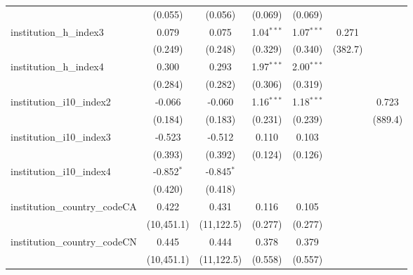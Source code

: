 \begin{tabular}{lcccccc}
                                         & (0.055)        & (0.056)        & (0.069)       & (0.069)       &               &   \\   
   institution\_h\_index3                & 0.079          & 0.075          & 1.04$^{***}$  & 1.07$^{***}$  & 0.271         &   \\   
                                         & (0.249)        & (0.248)        & (0.329)       & (0.340)       & (382.7)       &   \\   
   institution\_h\_index4                & 0.300          & 0.293          & 1.97$^{***}$  & 2.00$^{***}$  &               &   \\   
                                         & (0.284)        & (0.282)        & (0.306)       & (0.319)       &               &   \\   
   institution\_i10\_index2              & -0.066         & -0.060         & 1.16$^{***}$  & 1.18$^{***}$  &               & 0.723\\   
                                         & (0.184)        & (0.183)        & (0.231)       & (0.239)       &               & (889.4)\\   
   institution\_i10\_index3              & -0.523         & -0.512         & 0.110         & 0.103         &               &   \\   
                                         & (0.393)        & (0.392)        & (0.124)       & (0.126)       &               &   \\   
   institution\_i10\_index4              & -0.852$^{*}$   & -0.845$^{*}$   &               &               &               &   \\   
                                         & (0.420)        & (0.418)        &               &               &               &   \\   
   institution\_country\_codeCA          & 0.422          & 0.431          & 0.116         & 0.105         &               &   \\   
                                         & (10,451.1)     & (11,122.5)     & (0.277)       & (0.277)       &               &   \\   
   institution\_country\_codeCN          & 0.445          & 0.444          & 0.378         & 0.379         &               &   \\   
                                         & (10,451.1)     & (11,122.5)     & (0.558)       & (0.557)       &               &   \\   

\end{tabular}

